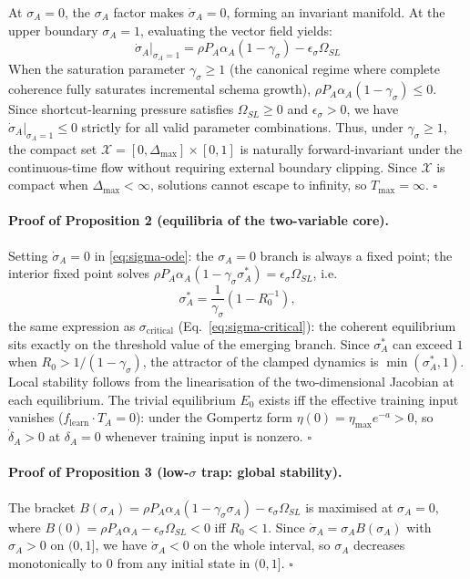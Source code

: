 \documentclass{article}
\theoremstyle{definition}
\begin{document}
At $\sigma_A = 0$, the $\sigma_A$ factor makes $\dot{\sigma}_A = 0$, forming an invariant manifold. At the upper boundary $\sigma_A = 1$, evaluating the vector field yields:
\begin{equation}
\dot{\sigma}_A\big|_{\sigma_A = 1} = \rho P_A \alpha_A (1 - \gamma_\sigma) - \epsilon_\sigma \Omega_{SL}
\end{equation}
When the saturation parameter $\gamma_\sigma \ge 1$ (the canonical regime where complete coherence fully saturates incremental schema growth), $\rho P_A \alpha_A (1 - \gamma_\sigma) \le 0$. Since shortcut-learning pressure satisfies $\Omega_{SL} \ge 0$ and $\epsilon_\sigma > 0$, we have $\dot{\sigma}_A\big|_{\sigma_A=1} \le 0$ strictly for all valid parameter combinations. Thus, under $\gamma_\sigma \ge 1$, the compact set $\mathcal{X} = [0, \Delta_{\max}] \times [0, 1]$ is naturally forward-invariant under the continuous-time flow without requiring external boundary clipping. Since $\mathcal{X}$ is compact when $\Delta_{\max} < \infty$, solutions cannot escape to infinity, so $T_{\max} = \infty$. $\square$

\paragraph*{Proof of Proposition 2 (equilibria of the two-variable
core).}
Setting $\dot{\sigma}_A = 0$ in \eqref{eq:sigma-ode}: the
$\sigma_A = 0$ branch is always a fixed point; the interior fixed point
solves $\rho P_A \alpha_A (1 - \gamma_\sigma \sigma_A^*) =
\epsilon_\sigma \Omega_{SL}$, i.e.
\begin{equation}\label{eq:sigma-equilibrium}
\sigma_A^* = \frac{1}{\gamma_\sigma}\left(1 - R_0^{-1}\right),
\end{equation}
the same expression as $\sigma_{\text{critical}}$
(Eq.~\eqref{eq:sigma-critical}): the coherent equilibrium sits exactly
on the threshold value of the emerging branch. Since $\sigma_A^*$ can
exceed $1$ when $R_0 > 1/(1-\gamma_\sigma)$, the attractor of the
clamped dynamics is $\min(\sigma_A^*, 1)$. Local stability follows from
the linearisation of the two-dimensional Jacobian at each equilibrium.
The trivial equilibrium $E_0$ exists iff the effective training input
vanishes ($f_{\text{learn}} \cdot T_A = 0$): under the Gompertz form
$\eta(0) = \eta_{\max} e^{-a} > 0$, so $\dot{\delta}_A > 0$ at
$\delta_A = 0$ whenever training input is nonzero. $\square$

\paragraph*{Proof of Proposition 3 (low-$\sigma$ trap: global
stability).}
The bracket $B(\sigma_A) = \rho P_A \alpha_A (1 - \gamma_\sigma
\sigma_A) - \epsilon_\sigma \Omega_{SL}$ is maximised at
$\sigma_A = 0$, where $B(0) = \rho P_A \alpha_A - \epsilon_\sigma
\Omega_{SL} < 0$ iff $R_0 < 1$. Since $\dot{\sigma}_A = \sigma_A
B(\sigma_A)$ with $\sigma_A > 0$ on $(0,1]$, we have
$\dot{\sigma}_A < 0$ on the whole interval, so $\sigma_A$ decreases
monotonically to $0$ from any initial state in $(0,1]$. $\square$
\end{document}
